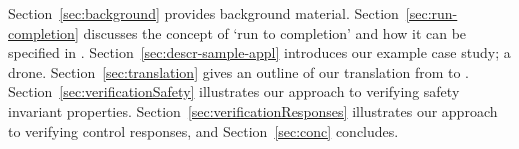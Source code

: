 Section~\ref{sec:background} provides background material. 
Section~\ref{sec:run-completion} discusses the \SC concept of `run to completion' and how it can be specified in \EventB. 
Section~\ref{sec:descr-sample-appl} introduces our example case study; a drone. 
Section~\ref{sec:translation} gives an outline of our translation from \SCXML to \EventB. 
Section~\ref{sec:verificationSafety} illustrates our approach to verifying safety invariant properties. Section~\ref{sec:verificationResponses} illustrates our approach to verifying control responses, and Section~\ref{sec:conc} concludes.




